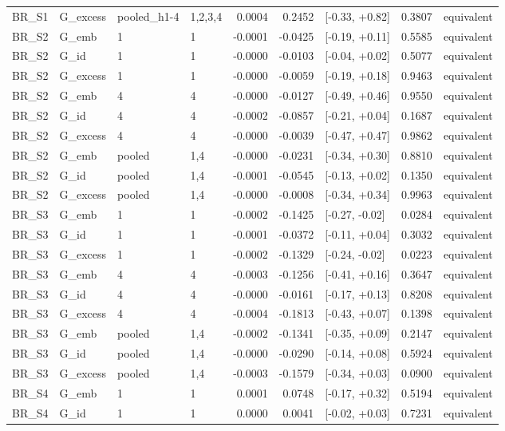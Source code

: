 \begin{tabular}{llllrrlrl}
BR\_S1 & G\_excess & pooled\_h1-4 & 1,2,3,4 & 0.0004 & 0.2452 & [-0.33, +0.82] & 0.3807 & equivalent \\
BR\_S2 & G\_emb & 1 & 1 & -0.0001 & -0.0425 & [-0.19, +0.11] & 0.5585 & equivalent \\
BR\_S2 & G\_id & 1 & 1 & -0.0000 & -0.0103 & [-0.04, +0.02] & 0.5077 & equivalent \\
BR\_S2 & G\_excess & 1 & 1 & -0.0000 & -0.0059 & [-0.19, +0.18] & 0.9463 & equivalent \\
BR\_S2 & G\_emb & 4 & 4 & -0.0000 & -0.0127 & [-0.49, +0.46] & 0.9550 & equivalent \\
BR\_S2 & G\_id & 4 & 4 & -0.0002 & -0.0857 & [-0.21, +0.04] & 0.1687 & equivalent \\
BR\_S2 & G\_excess & 4 & 4 & -0.0000 & -0.0039 & [-0.47, +0.47] & 0.9862 & equivalent \\
BR\_S2 & G\_emb & pooled & 1,4 & -0.0000 & -0.0231 & [-0.34, +0.30] & 0.8810 & equivalent \\
BR\_S2 & G\_id & pooled & 1,4 & -0.0001 & -0.0545 & [-0.13, +0.02] & 0.1350 & equivalent \\
BR\_S2 & G\_excess & pooled & 1,4 & -0.0000 & -0.0008 & [-0.34, +0.34] & 0.9963 & equivalent \\
BR\_S3 & G\_emb & 1 & 1 & -0.0002 & -0.1425 & [-0.27, -0.02] & 0.0284 & equivalent \\
BR\_S3 & G\_id & 1 & 1 & -0.0001 & -0.0372 & [-0.11, +0.04] & 0.3032 & equivalent \\
BR\_S3 & G\_excess & 1 & 1 & -0.0002 & -0.1329 & [-0.24, -0.02] & 0.0223 & equivalent \\
BR\_S3 & G\_emb & 4 & 4 & -0.0003 & -0.1256 & [-0.41, +0.16] & 0.3647 & equivalent \\
BR\_S3 & G\_id & 4 & 4 & -0.0000 & -0.0161 & [-0.17, +0.13] & 0.8208 & equivalent \\
BR\_S3 & G\_excess & 4 & 4 & -0.0004 & -0.1813 & [-0.43, +0.07] & 0.1398 & equivalent \\
BR\_S3 & G\_emb & pooled & 1,4 & -0.0002 & -0.1341 & [-0.35, +0.09] & 0.2147 & equivalent \\
BR\_S3 & G\_id & pooled & 1,4 & -0.0000 & -0.0290 & [-0.14, +0.08] & 0.5924 & equivalent \\
BR\_S3 & G\_excess & pooled & 1,4 & -0.0003 & -0.1579 & [-0.34, +0.03] & 0.0900 & equivalent \\
BR\_S4 & G\_emb & 1 & 1 & 0.0001 & 0.0748 & [-0.17, +0.32] & 0.5194 & equivalent \\
BR\_S4 & G\_id & 1 & 1 & 0.0000 & 0.0041 & [-0.02, +0.03] & 0.7231 & equivalent \\

\end{tabular}
